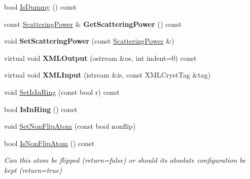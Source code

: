 \begin{DoxyCompactItemize}
bool \mbox{\hyperlink{class_obj_cryst_1_1_mol_atom_a7a9d47a67d585dd4e7f699ab481ad2c3}{Is\+Dummy}} () const
\item 
\mbox{\label{class_obj_cryst_1_1_mol_atom_a850c4401ec2c421c19597dc328797071}} 
const \mbox{\hyperlink{class_obj_cryst_1_1_scattering_power}{Scattering\+Power}} \& {\bfseries Get\+Scattering\+Power} () const
\item 
\mbox{\label{class_obj_cryst_1_1_mol_atom_aedf49d98c4759f96d2ca438e7d60c482}} 
void {\bfseries Set\+Scattering\+Power} (const \mbox{\hyperlink{class_obj_cryst_1_1_scattering_power}{Scattering\+Power}} \&)
\item 
\mbox{\label{class_obj_cryst_1_1_mol_atom_ab3361f1ec21231e0d2d9d9a3c545afc5}} 
virtual void {\bfseries X\+M\+L\+Output} (ostream \&os, int indent=0) const
\item 
\mbox{\label{class_obj_cryst_1_1_mol_atom_ab2d33c7d783142e5069331db99e36b59}} 
virtual void {\bfseries X\+M\+L\+Input} (istream \&is, const X\+M\+L\+Cryst\+Tag \&tag)
\item 
void \mbox{\hyperlink{class_obj_cryst_1_1_mol_atom_af9ee83ee7c3b03b1cd5adaad642799e3}{Set\+Is\+In\+Ring}} (const bool r) const
\item 
\mbox{\label{class_obj_cryst_1_1_mol_atom_a8a844eba953772595b63244678c6c606}} 
bool {\bfseries Is\+In\+Ring} () const
\item 
void \mbox{\hyperlink{class_obj_cryst_1_1_mol_atom_acf0078c575ef2f9b9c47eacc8d17ffa6}{Set\+Non\+Flip\+Atom}} (const bool nonflip)
\item 
\mbox{\label{class_obj_cryst_1_1_mol_atom_aac95920f11aadbb7bdb16418c537f5fb}} 
bool \mbox{\hyperlink{class_obj_cryst_1_1_mol_atom_aac95920f11aadbb7bdb16418c537f5fb}{Is\+Non\+Flip\+Atom}} () const
\begin{DoxyCompactList}\small\item\em Can this atom be flipped (return=false) or should its absolute configuration be kept (return=true) \end{DoxyCompactList}\end{DoxyCompactItemize}
\textbf{ }\par
